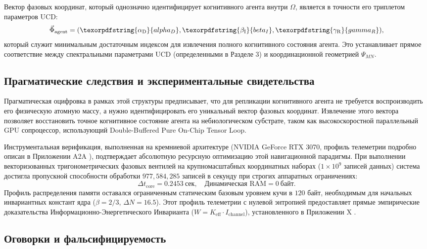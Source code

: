 \documentclass[12pt,a4paper]{article}
\DeclareRobustCommand{\alD}{\texorpdfstring{\ensuremath{\alpha_{\mathrm{D}}}}{alpha_D}}
\DeclareRobustCommand{\beI}{\texorpdfstring{\ensuremath{\beta_{\mathrm{I}}}}{beta_I}}
\DeclareRobustCommand{\gaR}{\texorpdfstring{\ensuremath{\gamma_{\mathrm{R}}}}{gamma_R}}
\begin{document}
	Вектор фазовых координат, который однозначно идентифицирует когнитивного агента внутри \(\Omega\), является в точности его триплетом параметров UCD:
	\[
	\vec{\Phi}_{\mathrm{agent}} = (\alD, \beI, \gaR),
	\]
	который служит минимальным достаточным индексом для извлечения полного когнитивного состояния агента. Это устанавливает прямое соответствие между спектральными параметрами UCD (определенными в Разделе 3) и координационной геометрией \(\Psi_{MN}\).
	
	\subsection{Прагматические следствия и экспериментальные свидетельства}
	
	Прагматическая оцифровка в рамках этой структуры предписывает, что для репликации когнитивного агента не требуется воспроизводить его физическую атомную массу, а нужно идентифицировать его уникальный вектор фазовых координат. Извлечение этого вектора позволяет восстановить точное когнитивное состояние агента на небиологическом субстрате, таком как высокоскоростной параллельный GPU сопроцессор, использующий Double-Buffered Pure On-Chip Tensor Loop.
	
	Инструментальная верификация, выполненная на кремниевой архитектуре (NVIDIA GeForce RTX 3070, профиль телеметрии подробно описан в Приложении A2A \cite{yuct_a2a}), подтверждает абсолютную ресурсную оптимизацию этой навигационной парадигмы. При выполнении векторизованных тригонометрических фазовых вентилей на крупномасштабных координатных наборах (\(1\times10^9\) записей данных) система достигла пропускной способности обработки \(977,584,285\) записей в секунду при строгих аппаратных ограничениях:
	\begin{equation}
		\Delta t_{\mathrm{core}} = 0.2453\ \text{сек}, \quad \text{Динамическая RAM} = 0\ \text{байт}.
	\end{equation}
	Профиль распределения памяти оставался ограниченным статическим базовым уровнем кучи в \(120\) байт, необходимым для начальных инвариантных констант ядра (\(\beta = 2/3\), \(\Delta N = 16.5\)). Этот профиль телеметрии с нулевой энтропией предоставляет прямые эмпирические доказательства Информационно-Энергетического Инварианта (\(W = K_{\mathrm{eff}} \cdot I_{\mathrm{channel}}\)), установленного в Приложении X \cite{yuct_appX}.
	
	\subsection{Оговорки и фальсифицируемость}
	
\end{document}
